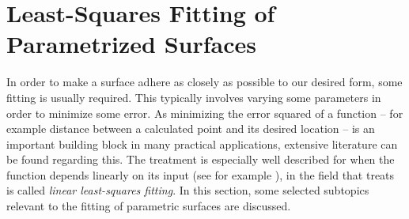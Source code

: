 \section{Least-Squares Fitting of Parametrized Surfaces}
\label{sec:LSQfitting}
In order to make a surface adhere as closely as possible to our desired form, some fitting is usually required. This typically involves varying some parameters in order to minimize some error. As minimizing the error squared of a function -- for example distance between a calculated point and its desired location -- is an important building block in many practical applications, extensive literature can be found regarding this. The treatment is especially well described for when the function depends linearly on its input (see for example \cite{becker2011advanced}), in the field that treats is called \emph{linear least-squares fitting}. In this section, some selected subtopics relevant to the fitting of parametric surfaces are discussed.



